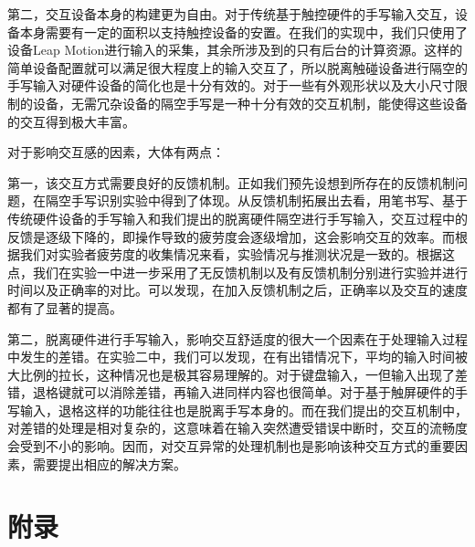 \documentclass[10pt, twocolumn]{article}
\begin{document}
第二，交互设备本身的构建更为自由。对于传统基于触控硬件的手写输入交互，设备本身需要有一定的面积以支持触控设备的安置。在我们的实现中，我们只使用了设备Leap Motion进行输入的采集，其余所涉及到的只有后台的计算资源。这样的简单设备配置就可以满足很大程度上的输入交互了，所以脱离触碰设备进行隔空的手写输入对硬件设备的简化也是十分有效的。对于一些有外观形状以及大小尺寸限制的设备，无需冗杂设备的隔空手写是一种十分有效的交互机制，能使得这些设备的交互得到极大丰富。

对于影响交互感的因素，大体有两点：

第一，该交互方式需要良好的反馈机制。正如我们预先设想到所存在的反馈机制问题，在隔空手写识别实验中得到了体现。从反馈机制拓展出去看，用笔书写、基于传统硬件设备的手写输入和我们提出的脱离硬件隔空进行手写输入，交互过程中的反馈是逐级下降的，即操作导致的疲劳度会逐级增加，这会影响交互的效率。而根据我们对实验者疲劳度的收集情况来看，实验情况与推测状况是一致的。根据这点，我们在实验一中进一步采用了无反馈机制以及有反馈机制分别进行实验并进行时间以及正确率的对比。可以发现，在加入反馈机制之后，正确率以及交互的速度都有了显著的提高。

第二，脱离硬件进行手写输入，影响交互舒适度的很大一个因素在于处理输入过程中发生的差错。在实验二中，我们可以发现，在有出错情况下，平均的输入时间被大比例的拉长，这种情况也是极其容易理解的。对于键盘输入，一但输入出现了差错，退格键就可以消除差错，再输入进同样内容也很简单。对于基于触屏硬件的手写输入，退格这样的功能往往也是脱离手写本身的。而在我们提出的交互机制中，对差错的处理是相对复杂的，这意味着在输入突然遭受错误中断时，交互的流畅度会受到不小的影响。因而，对交互异常的处理机制也是影响该种交互方式的重要因素，需要提出相应的解决方案。


\section{附录}
\end{document}
